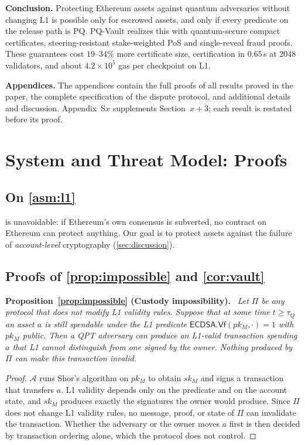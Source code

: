 \documentclass[10pt,journal,compsoc]{IEEEtran}
\theoremstyle{tplain}
\theoremstyle{tdef}
\theoremstyle{remark}
\newenvironment{restate}[1]{\par\smallskip\noindent\textbf{#1.}\ \itshape\ignorespaces}{\par\smallskip}
\begin{document}
\noindent\textbf{Conclusion.} Protecting Ethereum assets against quantum adversaries without changing L1 is possible only for escrowed assets, and only if every predicate on the release path is PQ. PQ-Vault realizes this with quantum-secure compact certificates, steering-resistant stake-weighted PoS and single-reveal fraud proofs. These guarantees cost $19$--$34\%$ more certificate size, certification in $0.65$\,s at $2048$ validators, and about $4.2\times10^5$ gas per checkpoint on L1.



\setcounter{section}{0}
\renewcommand{\thesection}{S\arabic{section}}
\noindent\textbf{Appendices.} The appendices contain the full proofs of all results proved in the paper, the complete specification of the dispute protocol, and additional details and discussion. Appendix~S$x$ supplements Section~$x+3$; each result is restated before its proof.
\section{System and Threat Model: Proofs}\label{S-model}

\subsection{On \cref{asm:l1}}
 is unavoidable: if Ethereum's own consensus is subverted, no contract on Ethereum can protect anything. Our goal is to protect assets against the failure of \emph{account-level} cryptography (\cref{sec:discussion}).

\subsection{Proofs of \cref{prop:impossible} and \cref{cor:vault}}

\begin{restate}{Proposition~\ref{prop:impossible} (Custody impossibility)}
Let $\Pi$ be any protocol that does not modify L1 validity rules. Suppose that at some time $t\ge\tau_Q$ an asset $a$ is still spendable under the L1 predicate $\mathsf{ECDSA.Vf}(pk_M,\cdot)=1$ with $pk_M$ public. Then a QPT adversary can produce an L1-valid transaction spending $a$ that L1 cannot distinguish from one signed by the owner. Nothing produced by $\Pi$ can make this transaction invalid.
\end{restate}
\begin{proof}
$\mathcal{A}$ runs Shor's algorithm on $pk_M$ to obtain $sk_M$ and signs a transaction that transfers $a$. L1 validity depends only on the predicate and on the account state, and $sk_M$ produces exactly the signatures the owner would produce. Since $\Pi$ does not change L1 validity rules, no message, proof, or state of $\Pi$ can invalidate the transaction. Whether the adversary or the owner moves $a$ first is then decided by transaction ordering alone, which the protocol does not control.
\end{proof}
\end{document}
